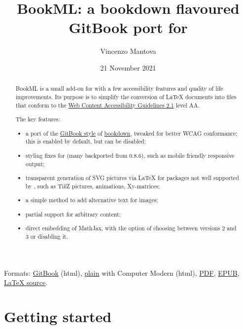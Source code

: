 \documentclass[a4paper,british]{article}
\title{BookML: a bookdown flavoured GitBook port for \texorpdfstring{\LaTeXML{}}{LaTeXML}}
\author{Vincenzo Mantova}
\date{21 November 2021}
\def\Xy{Xy}
\def\tikzname{Ti\emph{k}Z}
\begin{document}
\maketitle

\begin{abstract}
  BookML is a small add-on for \LaTeXML{} with a few accessibility features and quality of life improvements. Its purpose is to simplify the conversion of \LaTeX{} documents into \HTML{} files that conform to the \href{https://www.w3.org/TR/WCAG21/}{Web Content Accessibility Guidelines 2.1} level AA.

  The key features:
  \begin{itemize}
    \item a port of the \href{https://bookdown.org/yihui/bookdown/html.html#gitbook-style}{GitBook style} of \href{https://bookdown.org}{bookdown}, tweaked for better WCAG conformance; this is enabled by default, but can be disabled;
    \item styling fixes for \LaTeXML{} (many backported from 0.8.6), such as mobile friendly responsive output;
    \item transparent generation of SVG pictures via \LaTeX{} for packages not well supported by \LaTeXML{}, such as \tikzname{} pictures, animations, \Xy-matrices;
    \item a simple method to add alternative text for images;
    \item partial support for arbitrary \HTML{} content;
    \item direct embedding of MathJax, with the option of choosing between versions 2 and 3 or disabling it.
  \end{itemize}
\end{abstract}

\begin{center}
  Formats: \href{https://vlmantova.github.io/bookml/}{GitBook} (html), \href{https://vlmantova.github.io/bookml/index.plain.html}{plain} with Computer Modern (html), \href{https://vlmantova.github.io/bookml/docs.pdf}{PDF}, \href{https://vlmantova.github.io/bookml/docs.epub}{EPUB}, \href{https://github.com/vlmantova/bookml/blob/docs/docs.tex}{\LaTeX{} source}.
\end{center}

\tableofcontents

\section{Getting started}
\end{document}
